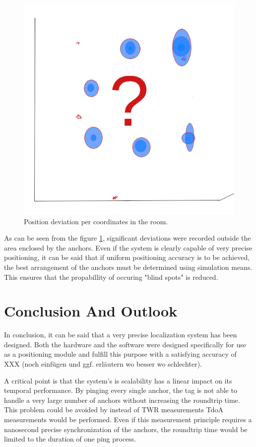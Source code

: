 \documentclass[conference, a4paper]{IEEEtran}
\begin{document}
\begin{figure}[hbt!]
	\centering
	\includegraphics[scale=0.35]{pic/position_plot.png}
	\caption{Position deviation per coordinates in the room.}
	\label{fig:statistics}
\end{figure}

As can be seen from the figure \ref{fig:statistics}, significant deviations were recorded outside the area enclosed by the anchors.
Even if the system is clearly capable of very precise positioning, it can be said that if uniform positioning accuracy is to be achieved,
the best arrangement of the anchors must be determined using simulation means.
This ensures that the propabillity of occuring "blind spots" is reduced.


\section{Conclusion And Outlook}\label{section:conclusion}
In conclusion, it can be said that a very precise localization system has been designed.
Both the hardware and the software were designed specifically for use as a positioning module and fulfill this purpose with a satisfying accuracy of XXX (noch einfügen und ggf. erläutern wo besser wo schlechter).

A critical point is that the system's is scalability has a linear impact on its temporal performance.
By pinging every single anchor, the tag is not able to handle a very large number of anchors without increasing the roundtrip time.
This problem could be avoided by instead of \ac{TWR} measurements \ac{TdoA} measurements would be performed.
Even if this measurement principle requires a nanosecond precise synchronization of the anchors,
the roundtrip time would be limited to the duration of one ping process.
\end{document}
